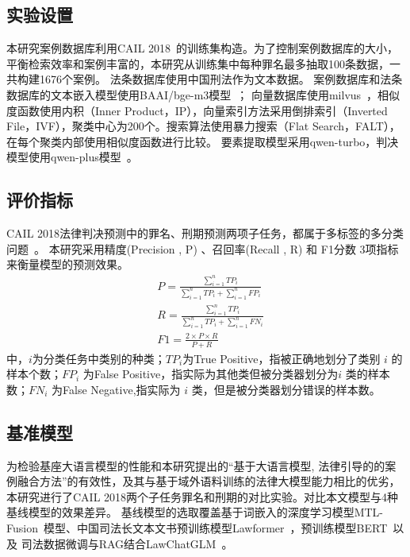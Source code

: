 \subsection{\heiti 实验设置}
本研究案例数据库利用CAIL 2018~\cite{xiao2018cail2018largescalelegaldataset}的训练集构造。为了控制案例数据库的大小，平衡检索效率和案例丰富的，本研究从训练集中每种罪名最多抽取100条数据，一共构建1676个案例。
法条数据库使用中国刑法作为文本数据。
案例数据库和法条数据库的文本嵌入模型使用BAAI/bge-m3模型~\cite{chenBGEM3EmbeddingMultiLingual2024}；
向量数据库使用milvus~\cite{2022manu,2021milvus}，相似度函数使用内积（Inner Product，IP），向量索引方法采用倒排索引（Inverted File，IVF），聚类中心为200个。搜索算法使用暴力搜索（Flat Search，FALT），在每个聚类内部使用相似度函数进行比较。
要素提取模型采用qwen-turbo，判决模型使用qwen-plus模型~\cite{qwenQwen25TechnicalReport2025}。

\subsection{\heiti 评价指标}
CAIL 2018法律判决预测中的罪名、刑期预测两项子任务，都属于多标签的多分类问题~\cite{xiao2018cail2018}。
本研究采用精度(Precision , P) 、召回率(Recall , R) 和 F1分数 3项指标来衡量模型的预测效果。
\begin{eqnarray}
	&P=\frac{\sum_{i=1}^{n}TP_{i}}{\sum_{i=1}^{n}TP_{i}+\sum_{i=1}^{n}FP_{i}}
	\\
	&R=\frac{\sum_{i=1}^{n}TP_{i}}{\sum_{i=1}^{n}TP_{i}+\sum_{i=1}^{n}FN_{i}}
	\\
	&F1=\frac{2\times P\times R}{P+R}
\end{eqnarray}
中，$i$为分类任务中类别的种类；$TP_i$为True Positive，指被正确地划分了类别 $i$ 的样本个数；$FP_i$ 为False Positive，指实际为其他类但被分类器划分为$i$ 类的样本数；$FN_i$ 为False Negative,指实际为 $i$ 类，但是被分类器划分错误的样本数。


\subsection{\heiti 基准模型}
为检验基座大语言模型的性能和本研究提出的“基于大语言模型, 法律引导的的案例融合方法”的有效性，及其与基于域外语料训练的法律大模型能力相比的优劣，本研究进行了CAIL 2018两个子任务罪名和刑期的对比实验。对比本文模型与4种基线模型的效果差异。
基线模型的选取覆盖基于词嵌入的深度学习模型MTL-Fusion~\cite{zhuopeng-etal-2020-multi}模型、中国司法长文本文书预训练模型Lawformer~\cite{xiao2021lawformer}，预训练模型BERT~\cite{fan2022multi}以及 司法数据微调与RAG结合LawChatGLM~\cite{JSJA202505027}。

